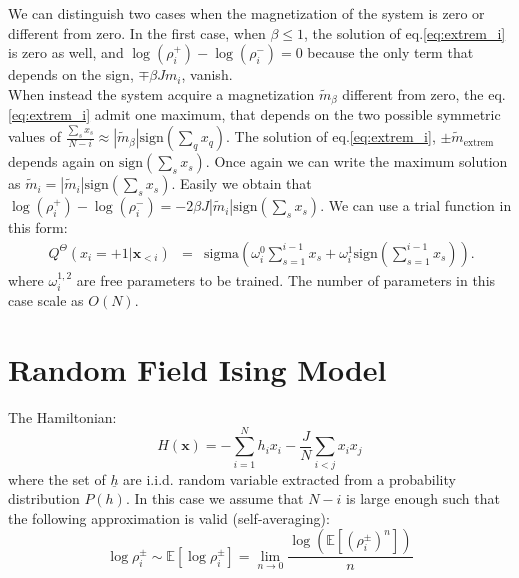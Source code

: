 \documentclass{article}
\begin{document}
We can distinguish two cases when the magnetization of the system is zero or different from zero. 
In the first case, when $\beta\leq1$, the solution of eq.\ref{eq:extrem_i} is zero as well, and $\log(\rho_i^{+}) - \log(\rho_i^{-})=0$ because the only term that depends on the sign, $\mp \beta J m_i$, vanish.\\ 
When instead the system acquire a magnetization $\tilde{m}_{\beta}$ different from zero, the eq.\ref{eq:extrem_i} admit one maximum, that depends on the two possible symmetric values of $\frac{\sum_s x_s}{N-i}\approx |\tilde{m}_{\beta}| \text{sign}(\sum_q x_q)$. 
The solution of eq.\ref{eq:extrem_i}, $\pm \tilde{m}_{\text{extrem}}$ depends again on $\text{sign}(\sum_s x_s)$. 
Once again we can write the maximum solution as $\tilde{m}_{i}=|\tilde{m}_i| \text{sign}(\sum_s x_s)$. 
Easily we obtain that $\log(\rho_i^{+}) - \log(\rho_i^{-}) = -2\beta J|\tilde{m}_i| \text{sign}(\sum_s x_s)$. 
We can use a trial function in this form:
\begin{eqnarray}\
\label{eq:curie_weiss_cond2}
Q^{\Theta}\left(x_{i}=+1|\mathbf{x}_{<i}\right) & = & \text{sigma}\left(\omega_{i}^0\sum_{s=1}^{i-1}x_{s} + \omega_i^1 \text{sign}(\sum_{s=1}^{i-1}x_{s})\right).
\end{eqnarray}
where $\omega_i^{1,2}$ are free parameters to be trained. The number of parameters in this case scale as $O(N)$.



\section{Random Field Ising Model}
The Hamiltonian:
\begin{equation}
H\left(\mathbf{x}\right)=-\sum_{i=1}^{N}h_ix_{i}-\frac{J}{N}\sum_{i<j}x_{i}x_{j}
\end{equation}
where the set of $\underline{h}$ are i.i.d. random variable extracted from a probability distribution $P(h)$. In this case 
we assume that $N-i$ is large enough such that the following approximation is valid (self-averaging): 
\[
\log\rho_i^{\pm} \sim \mathbb{E}\left[  \log\rho_i^{\pm} \right] = \lim_{n\rightarrow 0} \frac{  \log(\mathbb{E}\left[(\rho_i^{\pm})^n \right])}{n}
\]
\end{document}
